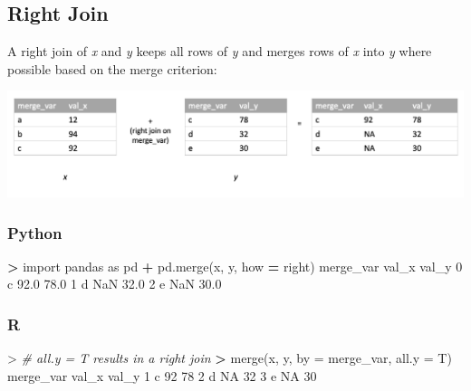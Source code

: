 \documentclass[
]{book}
\newenvironment{Shaded}{\begin{snugshade}}{\end{snugshade}}
\newcommand{\AttributeTok}[1]{\textcolor[rgb]{0.77,0.63,0.00}{#1}}
\newcommand{\CommentTok}[1]{\textcolor[rgb]{0.56,0.35,0.01}{\textit{#1}}}
\newcommand{\ConstantTok}[1]{\textcolor[rgb]{0.00,0.00,0.00}{#1}}
\newcommand{\DecValTok}[1]{\textcolor[rgb]{0.00,0.00,0.81}{#1}}
\newcommand{\ErrorTok}[1]{\textcolor[rgb]{0.64,0.00,0.00}{\textbf{#1}}}
\newcommand{\FloatTok}[1]{\textcolor[rgb]{0.00,0.00,0.81}{#1}}
\newcommand{\FunctionTok}[1]{\textcolor[rgb]{0.00,0.00,0.00}{#1}}
\newcommand{\ImportTok}[1]{#1}
\newcommand{\NormalTok}[1]{#1}
\newcommand{\OperatorTok}[1]{\textcolor[rgb]{0.81,0.36,0.00}{\textbf{#1}}}
\newcommand{\SpecialCharTok}[1]{\textcolor[rgb]{0.00,0.00,0.00}{#1}}
\newcommand{\StringTok}[1]{\textcolor[rgb]{0.31,0.60,0.02}{#1}}
\begin{document}
\hypertarget{right-join}{%
\subsection{Right Join}\label{right-join}}

A right join of \emph{x} and \emph{y} keeps all rows of \emph{y} and merges rows of \emph{x} into \emph{y} where possible based on the merge criterion:

\includegraphics[width=17.25in]{images/right_join}

\hypertarget{python-28}{%
\subsubsection*{Python}\label{python-28}}

\begin{Shaded}
\begin{Highlighting}[]
\OperatorTok{\textgreater{}} \ImportTok{import}\NormalTok{ pandas }\ImportTok{as}\NormalTok{ pd}
\OperatorTok{+}\NormalTok{ pd.merge(x, y, how }\OperatorTok{=} \StringTok{\textquotesingle{}right\textquotesingle{}}\NormalTok{)}
\NormalTok{  merge\_var  val\_x  val\_y}
\DecValTok{0}\NormalTok{         c   }\FloatTok{92.0}   \FloatTok{78.0}
\DecValTok{1}\NormalTok{         d    NaN   }\FloatTok{32.0}
\DecValTok{2}\NormalTok{         e    NaN   }\FloatTok{30.0}
\end{Highlighting}
\end{Shaded}

\hypertarget{r-28}{%
\subsubsection*{R}\label{r-28}}

\begin{Shaded}
\begin{Highlighting}[]
\SpecialCharTok{\textgreater{}} \CommentTok{\# all.y = T results in a right join}
\ErrorTok{\textgreater{}} \FunctionTok{merge}\NormalTok{(x, y, }\AttributeTok{by =} \StringTok{\textquotesingle{}merge\_var\textquotesingle{}}\NormalTok{, }\AttributeTok{all.y =}\NormalTok{ T)}
\NormalTok{  merge\_var val\_x val\_y}
\DecValTok{1}\NormalTok{         c    }\DecValTok{92}    \DecValTok{78}
\DecValTok{2}\NormalTok{         d    }\ConstantTok{NA}    \DecValTok{32}
\DecValTok{3}\NormalTok{         e    }\ConstantTok{NA}    \DecValTok{30}
\end{Highlighting}
\end{Shaded}
\end{document}
